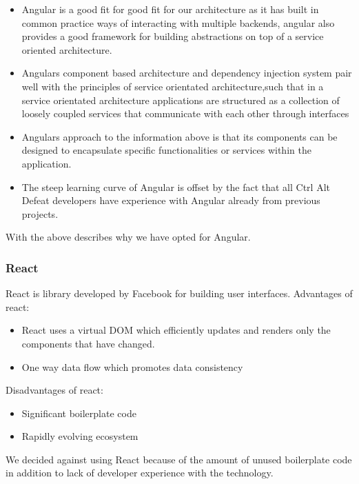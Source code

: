 \documentclass[12pt]{article}
\begin{document}
\begin{itemize}
    \item Angular is a good fit for good fit for our architecture as it has built in common practice ways of interacting with multiple backends, angular also provides a good framework for building abstractions on top of a service oriented architecture. 
    \item Angulars component based architecture and dependency injection system pair well with the principles of service orientated architecture,such that in a service orientated architecture applications are structured as a collection of loosely coupled services that communicate with each other through interfaces
    \item Angulars approach to the information above is that its components can be designed to encapsulate specific functionalities or services within the application.
    \item The steep learning curve of Angular is offset by the fact that all Ctrl Alt Defeat developers have experience with Angular already from previous projects.
\end{itemize}
With the above describes why we have opted for Angular.
\subsubsection{React}
React is library developed by Facebook for building user interfaces.
Advantages of react:
\begin{itemize}
    \item React uses a virtual DOM which efficiently updates and renders only the components that have changed.
    \item One way data flow which promotes data consistency
\end{itemize}
Disadvantages of react:
\begin{itemize}
    \item Significant boilerplate code
    \item Rapidly evolving ecosystem
\end{itemize}
We decided against using React because of the amount of unused boilerplate code in addition to lack of developer experience with the technology.
\end{document}
